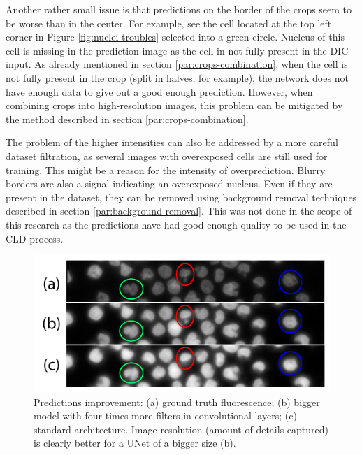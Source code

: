Another rather small issue is that predictions on the border of the crops seem to be worse than in the center. For example, see the cell located at the top left corner in Figure \ref{fig:nuclei-troubles} selected into a green circle. Nucleus of this cell is missing in the prediction image as the cell in not fully present in the DIC input. As already mentioned in section \ref{par:crops-combination}, when the cell is not fully present in the crop (split in halves, for example), the network does not have enough data to give out a good enough prediction. However, when combining crops into high-resolution images, this problem can be mitigated by the method described in section \ref{par:crops-combination}.

The problem of the higher intensities can also be addressed by a more careful dataset filtration, as several images with overexposed cells are still used for training. This might be a reason for the intensity of overprediction. Blurry borders are also a signal indicating an overexposed nucleus. Even if they are present in the dataset, they can be removed using background removal techniques described in section \ref{par:background-removal}. This was not done in the scope of this research as the predictions have had good enough quality to be used in the CLD process.

\begin{figure}[htb]
	\begin{center}
		\includegraphics[width=0.6\linewidth]{bilder/nuclei/bigger-model.png}
		\caption[Predictions improvement]%
		{Predictions improvement: (a) ground truth fluorescence; (b) bigger model with four times more filters in convolutional layers; (c) standard architecture. Image resolution (amount of details captured) is clearly better for a UNet of a bigger size (b). }\label{fig:better-nuclei}
	\end{center}
\end{figure}
